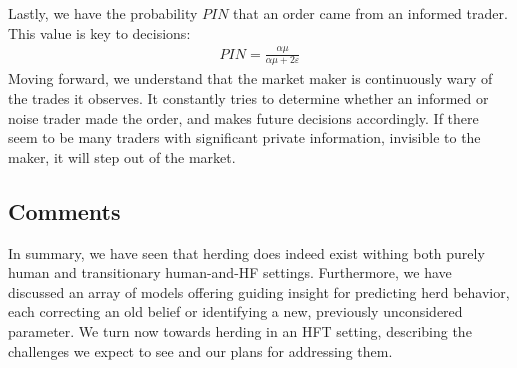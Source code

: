 Lastly, we have the probability $PIN$ that an order came from an informed trader. 
This value is key to decisions:
\begin{align*}
  PIN = \frac{\alpha\mu}{\alpha\mu + 2\varepsilon}
\end{align*}
Moving forward, we understand that the market maker is continuously wary of the trades it observes.
It constantly tries to determine whether an informed or noise trader made the order, and makes future decisions accordingly. 
If there seem to be many traders with significant private information, invisible to the maker, it will step out of the market.



\subsection{Comments}
In summary, we have seen that herding does indeed exist withing both purely human and transitionary human-and-HF settings.
Furthermore, we have discussed an array of models offering guiding insight for predicting herd behavior, each correcting an old belief or identifying a new, previously unconsidered parameter.
We turn now towards herding in an HFT setting, describing the challenges we expect to see and our plans for addressing them.

